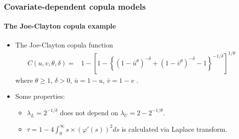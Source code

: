 \documentclass[10pt,aspectratio=169]{beamer}
\begin{document}



\begin{frame}
  \frametitle{Covariate-dependent copula models}
  \framesubtitle{The Joe-Clayton copula example}
  \begin{itemize}
  \item The Joe-Clayton copula function
    \[
    \begin{split}
      C(u,v,\theta,\delta)=&1-\left[1-\left\{\left(1-\bar u ^{\theta }\right)^{-\delta
          }+\left(1-\bar v ^{\theta }\right)^{-\delta }-1\right\}^{-1/\delta
        }\right]^{1/\theta }
    \end{split}
    \]
    where $\theta \geq 1$, $\delta > 0$, $\bar u = 1-u$, $\bar v = 1-v$ .

  \item Some properties:
    \begin{itemize}

    \item $\lambda_L=2^{-1/\delta}$ does not depend on $\lambda_U=2-2^{-1/\theta}$.
    \item  $\tau=1- 4\int _0^{\infty} s\times(\varphi'(s))^2ds$ is calculated via Laplace transform.
    \end{itemize}
  \end{itemize}

\end{frame}
\end{document}
